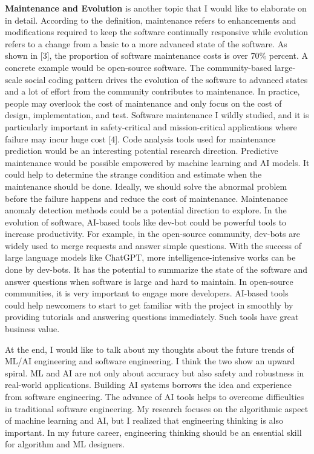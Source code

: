 \documentclass[11pt]{article}
\begin{document}
\textbf{Maintenance and Evolution} is another topic that I would like to elaborate on in detail. According to the definition, maintenance refers to enhancements and modifications required to keep the software continually responsive while evolution refers to a change from a basic to a more advanced state of the software. As shown in [3], the proportion of software maintenance costs is over 70\% percent. A concrete example would be open-source software. The community-based large-scale social coding pattern drives the evolution of the software to advanced states and a lot of effort from the community contributes to maintenance.  In practice, people may overlook the cost of maintenance and only focus on the cost of design, implementation, and test. Software maintenance I wildly studied, and it is particularly important in safety-critical and mission-critical applications where failure may incur huge cost [4]. Code analysis tools used for maintenance prediction would be an interesting potential research direction. Predictive maintenance would be possible empowered by machine learning and AI models. It could help to determine the strange condition and estimate when the maintenance should be done. Ideally, we should solve the abnormal problem before the failure happens and reduce the cost of maintenance. Maintenance anomaly detection methods could be a potential direction to explore. In the evolution of software, AI-based tools like dev-bot could be powerful tools to increase productivity. For example, in the open-source community, dev-bots are widely used to merge requests and answer simple questions. With the success of large language models like ChatGPT, more intelligence-intensive works can be done by dev-bots. It has the potential to summarize the state of the software and answer questions when software is large and hard to maintain. In open-source communities, it is very important to engage more developers. AI-based tools could help newcomers to start to get familiar with the project in smoothly by providing tutorials and answering questions immediately. Such tools have great business value.

At the end, I would like to talk about my thoughts about the future trends of ML/AI engineering and software engineering. I think the two show an upward spiral. ML and AI are not only about accuracy but also safety and robustness in real-world applications. Building AI systems borrows the idea and experience from software engineering. The advance of AI tools helps to overcome difficulties in traditional software engineering. My research focuses on the algorithmic aspect of machine learning and AI, but I realized that engineering thinking is also important. In my future career, engineering thinking should be an essential skill for algorithm and ML designers.
\end{document}
